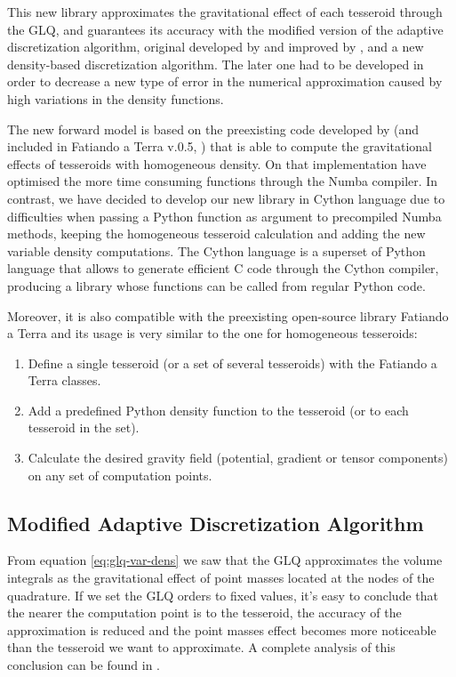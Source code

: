\documentclass[extra]{gji}
\begin{document}
This new library approximates the gravitational effect of each tesseroid through the GLQ, and guarantees its accuracy with the modified version of the adaptive discretization algorithm, original developed by \citet{Li2011} and improved by \citet{Uieda2016}, and a new density-based discretization algorithm.
The later one had to be developed in order to decrease a new type of error in the numerical approximation caused by high variations in the density functions.

The new forward model is based on the preexisting code developed by \citet{Uieda2016} (and included in Fatiando a Terra v.0.5, \citet{Uieda2013}) that is able to compute the gravitational effects of tesseroids with homogeneous density.
On that implementation \citet{Uieda2016} have optimised the more time consuming functions through the Numba compiler.
In contrast, we have decided to develop our new library in Cython language due to difficulties when passing a Python function as argument to precompiled Numba methods, keeping the homogeneous tesseroid calculation and adding the new variable density computations.
The Cython language is a superset of Python language that allows to generate efficient C code through the Cython compiler, producing a library whose functions can be called from regular Python code.

Moreover, it is also compatible with the preexisting open-source library Fatiando a Terra and its usage is very similar to the one for homogeneous tesseroids:

\begin{enumerate}
\renewcommand{\theenumi}{(\arabic{enumi})}
    \item Define a single tesseroid (or a set of several tesseroids) with the Fatiando a Terra classes.
    \item Add a predefined Python density function to the tesseroid (or to each tesseroid in the set).
    \item Calculate the desired gravity field (potential, gradient or tensor components) on any set of computation points.
\end{enumerate}


\subsection{Modified Adaptive Discretization Algorithm}

From equation \ref{eq:glq-var-dens} we saw that the GLQ approximates the volume integrals as the gravitational effect of point masses located at the nodes of the quadrature.
If we set the GLQ orders to fixed values, it's easy to conclude that the nearer the computation point is to the tesseroid, the accuracy of the approximation is reduced and the point masses effect becomes more noticeable than the tesseroid we want to approximate.
A complete analysis of this conclusion can be found in \citet{Ku1977, Li2011, Uieda2016}.
\end{document}
